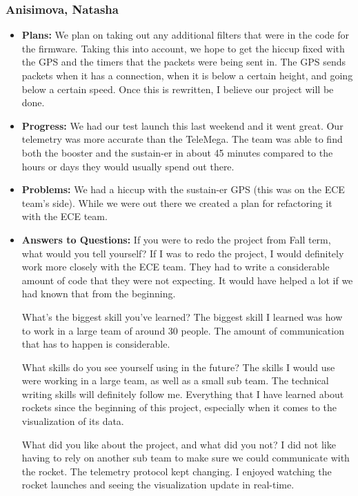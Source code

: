 \documentclass[10pt,draftclsnofoot,onecolumn]{IEEEtran}
\begin{document}
\subsubsection{Anisimova, Natasha}
\begin{itemize}
	\item \textbf{Plans: }
We plan on taking out any additional filters that were in the code for the firmware. Taking this into account, we hope to get the hiccup fixed with the GPS and the timers that the packets were being sent in. The GPS sends packets when it has a connection, when it is below a certain height, and going below a certain speed. Once this is rewritten, I believe our project will be done.
	\item \textbf{Progress:  }
We had our test launch this last weekend and it went great. Our telemetry was more accurate than the TeleMega. The team was able to find both the booster and the sustain-er in about 45 minutes compared to the hours or days they would usually spend out there.
	\item \textbf{Problems: }
	We had a hiccup with the sustain-er GPS (this was on the ECE team's side). While we were out there we created a plan for refactoring it with the ECE team.
	\item\textbf{Answers to Questions: }
	If you were to redo the project from Fall term, what would you tell yourself? If I was to redo the project, I would definitely work more closely with the ECE team. They had to write a considerable amount of code that they were not expecting. It would have helped a lot if we had known that from the beginning.

	What's the biggest skill you've learned? The biggest skill I learned was how to work in a large team of around 30 people. The amount of communication that has to happen is considerable.

	What skills do you see yourself using in the future? The skills I would use were working in a large team, as well as a small sub team. The technical writing skills will definitely follow me. Everything that I have learned about rockets since the beginning of this project, especially when it comes to the visualization of its data.

	What did you like about the project, and what did you not? I did not like having to rely on another sub team to make sure we could communicate with the rocket. The telemetry protocol kept changing. I enjoyed watching the rocket launches and seeing the visualization update in real-time.


\end{itemize}
\end{document}
